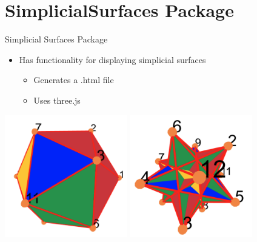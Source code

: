\documentclass{beamer}
\numberwithin{equation}{aufgabe}
\begin{document}
\section{SimplicialSurfaces Package}
\begin{frame}{Simplicial Surfaces Package}
    \begin{itemize}[label=-]
        \item Has functionality for displaying simplicial surfaces
        \begin{itemize}[label=-]
            \item Generates a .html file
            \item Uses three.js
        \end{itemize}
    \end{itemize}
    \pause
    \begin{example}
        \centering
        \includegraphics[width=0.4\textwidth]{images/ico-old.png}
        \hspace{10px}
        \includegraphics[width=0.4\textwidth]{images/ico2-1_old.png}
    \end{example}
\end{frame}
\end{document}
